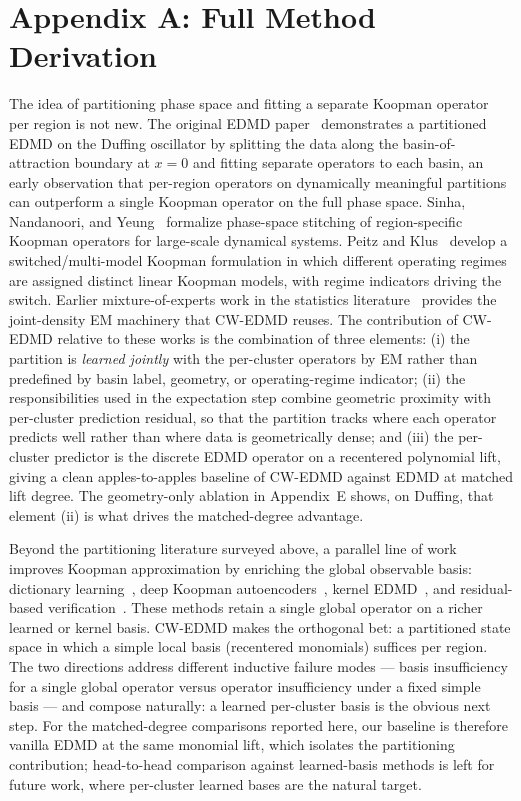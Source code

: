 \documentclass{article}
\begin{document}
\section*{Appendix A: Full Method Derivation}

The idea of partitioning phase space and fitting a separate Koopman operator per region is not new. The original EDMD paper~\citep{williams2015edmd} demonstrates a partitioned EDMD on the Duffing oscillator by splitting the data along the basin-of-attraction boundary at $x{=}0$ and fitting separate operators to each basin, an early observation that per-region operators on dynamically meaningful partitions can outperform a single Koopman operator on the full phase space. Sinha, Nandanoori, and Yeung~\citep{sinha2020phase} formalize phase-space stitching of region-specific Koopman operators for large-scale dynamical systems. Peitz and Klus~\citep{peitz2019switched} develop a switched/multi-model Koopman formulation in which different operating regimes are assigned distinct linear Koopman models, with regime indicators driving the switch. Earlier mixture-of-experts work in the statistics literature~\citep{jordan1994hme,gershenfeld1999nature,ingrassia2014linear,punzo2014polynomial} provides the joint-density EM machinery that CW-EDMD reuses. The contribution of CW-EDMD relative to these works is the combination of three elements: (i) the partition is \emph{learned jointly} with the per-cluster operators by EM rather than predefined by basin label, geometry, or operating-regime indicator; (ii) the responsibilities used in the expectation step combine geometric proximity with per-cluster prediction residual, so that the partition tracks where each operator predicts well rather than where data is geometrically dense; and (iii) the per-cluster predictor is the discrete EDMD operator on a recentered polynomial lift, giving a clean apples-to-apples baseline of CW-EDMD against EDMD at matched lift degree. The geometry-only ablation in Appendix~E shows, on Duffing, that element (ii) is what drives the matched-degree advantage.

Beyond the partitioning literature surveyed above, a parallel line of work improves Koopman approximation by enriching the global observable basis: dictionary learning~\citep{li2017dictionary}, deep Koopman autoencoders~\citep{lusch2018deep,takeishi2017koopman,yeung2019deep}, kernel EDMD~\citep{williams2015kernel,klus2020generator}, and residual-based verification~\citep{colbrook2023mpedmd}. These methods retain a single global operator on a richer learned or kernel basis. CW-EDMD makes the orthogonal bet: a partitioned state space in which a simple local basis (recentered monomials) suffices per region. The two directions address different inductive failure modes --- basis insufficiency for a single global operator versus operator insufficiency under a fixed simple basis --- and compose naturally: a learned per-cluster basis is the obvious next step. For the matched-degree comparisons reported here, our baseline is therefore vanilla EDMD at the same monomial lift, which isolates the partitioning contribution; head-to-head comparison against learned-basis methods is left for future work, where per-cluster learned bases are the natural target.
\end{document}
